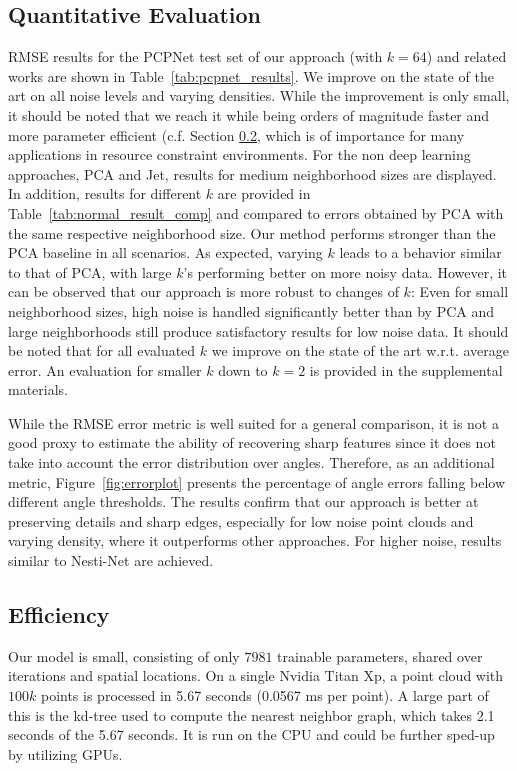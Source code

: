 \documentclass[10pt,twocolumn,letterpaper]{article}
\begin{document}
\subsection{Quantitative Evaluation}
\label{sec:quantitative}
RMSE results for the PCPNet test set of our approach (with $k = 64$) and related 
works are shown in Table~\ref{tab:pcpnet_results}.  We improve on the
state of the art on all noise levels and varying densities. While the improvement is only small, it should be noted that we reach it while being orders of magnitude faster and more parameter efficient (c.f. Section \ref{sec:complexity}, which is of importance for many applications in resource constraint environments. For the non deep
learning approaches, PCA and Jet, results for medium neighborhood sizes are
displayed. 
In addition, results for different $k$ are provided in 
Table~\ref{tab:normal_result_comp} and compared to errors obtained by PCA with the
same respective neighborhood size. Our method performs stronger than the PCA baseline in all scenarios. 
As expected, varying $k$ leads to a behavior similar to that of PCA, with large 
$k$'s performing better on more noisy data. However, it can be observed that our 
approach is more robust to changes of $k$: Even for small neighborhood sizes, high 
noise is handled significantly better than by PCA and large neighborhoods still 
produce satisfactory results for low noise data. 
It should be noted that for all evaluated $k$ we improve on the state of the
art w.r.t. average error. An evaluation for smaller $k$ down to $k=2$ is provided in the supplemental materials.

While the RMSE error metric is well suited for a general comparison, it is not 
a good proxy to estimate the ability of recovering sharp features since it does not
take into account the error distribution over angles. Therefore, as an additional metric, 
Figure~\ref{fig:errorplot} presents the percentage of angle errors falling below 
different angle thresholds. 
The results confirm that our approach is better at preserving details and sharp
edges, especially for low noise point clouds and varying density, where it 
outperforms other approaches. For higher noise, results similar to 
Nesti-Net are achieved.


\subsection{Efficiency}
\label{sec:complexity}
Our model is small, consisting of only $7981$ trainable parameters,
shared over iterations and spatial locations. 
On a single Nvidia Titan Xp, a point cloud with $100k$ points is 
processed in 5.67 seconds (0.0567 ms per point). 
A large part of this is the kd-tree used to compute the nearest
neighbor graph, which takes 2.1 seconds of the 5.67 seconds.
It is run on the CPU and could be further sped-up by utilizing GPUs.
\end{document}
